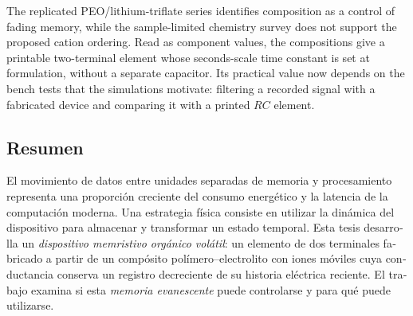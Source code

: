 \documentclass[12pt, twoside]{report}
\begin{document}
The replicated PEO/lithium-triflate series identifies composition as a control of
fading memory, while the sample-limited chemistry survey does not support the
proposed cation ordering. Read as component values, the compositions give a
printable two-terminal element whose seconds-scale time constant is set at
formulation, without a separate capacitor. Its practical value now depends on the
bench tests that the simulations motivate: filtering a recorded signal with a
fabricated device and comparing it with a printed $RC$ element.

\begin{otherlanguage}{spanish}
\chapter*{Resumen}

El movimiento de datos entre unidades separadas de memoria y procesamiento
representa una proporción creciente del consumo energético y la latencia de la
computación moderna. Una estrategia física consiste en utilizar la dinámica del
dispositivo para almacenar y transformar un estado temporal. Esta tesis
desarrolla un \emph{dispositivo memristivo orgánico volátil}: un elemento de dos
terminales fabricado a partir de un compósito polímero--electrolito con iones
móviles cuya conductancia conserva un registro decreciente de su historia
eléctrica reciente. El trabajo examina si esta \emph{memoria evanescente} puede
controlarse y para qué puede utilizarse.


\end{otherlanguage}
\end{document}
